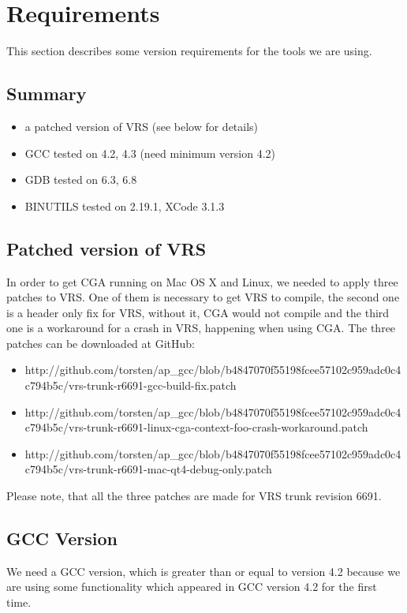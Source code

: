 \section{Requirements} This section describes some version requirements for the tools we are using. 

\subsection{Summary}
\begin{itemize}
    \item a patched version of VRS (see below for details)
	\item GCC tested on 4.2, 4.3 (need minimum version 4.2)
	\item GDB tested on 6.3, 6.8
	\item BINUTILS tested on 2.19.1, XCode 3.1.3
\end{itemize}

\subsection{Patched version of VRS} In order to get CGA running on Mac OS X and Linux, we needed to apply three patches to VRS. One of them is necessary to get VRS to compile, the second one is a header only fix for VRS, without it, CGA would not compile and the third one is a workaround for a crash in VRS, happening when using CGA. The three patches can be downloaded at GitHub:

\begin{itemize}
\item http://github.com/torsten/ap\_gcc/blob/b4847070f55198fcee57102c959adc0c4c794b5c/vrs-trunk-r6691-gcc-build-fix.patch
\item http://github.com/torsten/ap\_gcc/blob/b4847070f55198fcee57102c959adc0c4c794b5c/vrs-trunk-r6691-linux-cga-context-foo-crash-workaround.patch
\item http://github.com/torsten/ap\_gcc/blob/b4847070f55198fcee57102c959adc0c4c794b5c/vrs-trunk-r6691-mac-qt4-debug-only.patch
\end{itemize}

Please note, that all the three patches are made for VRS trunk revision 6691.

\subsection{GCC Version} We need a GCC version, which is greater than or equal to version 4.2 because we are using some functionality which appeared in GCC version 4.2 for the first time.

